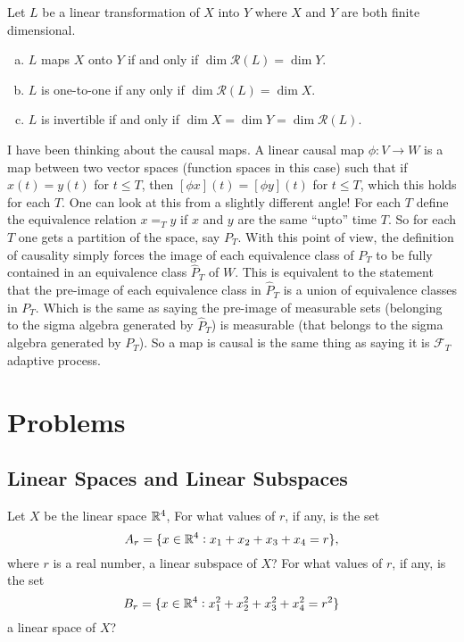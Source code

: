  
 

 
 
 
 \begin{summary}
 	Let $ L $ be a linear transformation of $ X $ into $ Y $ where $ X $ and $ Y $ are both finite dimensional.
 	\begin{enumerate}[(a)]
 		\item $ L $ maps $ X $ onto $ Y $ if and only if $ \dim \mathcal{R}(L) = \dim Y $.
 		\item $ L $ is one-to-one if any only if $ \dim \mathcal{R}(L) = \dim X $.
 		\item $ L $ is invertible if and only if $ \dim X = \dim Y = \dim \mathcal{R}(L) $.
 	\end{enumerate}
 \end{summary}
 
 
 \begin{summary}
 	I have been thinking about the causal maps. A linear causal map $ \phi: V\to W $ is a map between two vector spaces (function spaces in this case) such that if $ x(t) = y(t) $ for $ t\leq T $, then $ [\phi x](t) = [\phi y](t) $ for $ t\leq T $, which this holds for each $ T $. One can look at this from a slightly different angle! For each $ T $ define the equivalence relation $ x =_T y $ if $ x $ and $ y $ are the same ``upto'' time $ T $. So for each $ T $ one gets a partition of the space, say $ P_T $. With this point of view, the definition of causality simply forces the image of each equivalence class of $ P_T $ to be fully contained in an equivalence class $ \hat{P}_T $ of $ W $. This is equivalent to the statement that the pre-image of each equivalence class in $ \hat{P}_T $ is a union of equivalence classes in $ P_T $. Which is the same as saying the pre-image of measurable sets (belonging to the sigma algebra generated by $ \hat{P}_T $) is measurable (that belongs to the sigma algebra generated by $ P_T $). So a map is causal is the same thing as saying it is $ \mathcal{F}_T $ adaptive process.
 \end{summary}
 
 
 
 
 


\section{Problems}

\subsection{Linear Spaces and Linear Subspaces}
\begin{problem}
	Let $ X $ be the linear space $ \mathbb{R}^4 $, For what values of $ r $, if any, is the set
	\[ A_r = \{x\in\mathbb{R}^4: x_1+x_2+x_3+x_4 = r\}, \]
	where $ r $ is a real number, a linear subspace of $ X $? For what values of $ r $, if any,
	is the set
	\[ B_r = \{x\in \mathbb{R}^4: x_1^2 + x_2^2 + x_3^2+x_4^2 = r^2\} \]
	a linear space of $ X $?
\end{problem}


